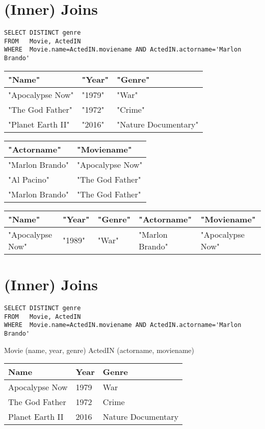 \documentclass{article}
\begin{document}
\section*{(Inner) Joins}
\begin{verbatim}
SELECT DISTINCT genre
FROM   Movie, ActedIN
WHERE  Movie.name=ActedIN.moviename AND ActedIN.actorname='Marlon Brando'
\end{verbatim}

\begin{tabular}{lll}
\hline
"Name" & "Year" & "Genre" \\
\hline
"Apocalypse Now" & "1979" & "War" \\
"The God Father" & "1972" & "Crime" \\
"Planet Earth II" & "2016" & "Nature Documentary" \\
\hline
\end{tabular}

\begin{tabular}{ll}
\hline
"Actorname" & "Moviename" \\
\hline
"Marlon Brando" & "Apocalypse Now" \\
"Al Pacino" & "The God Father" \\
"Marlon Brando" & "The God Father" \\
\hline
\end{tabular}

\begin{tabular}{lllll}
\hline
"Name" & "Year" & "Genre" & "Actorname" & "Moviename" \\
\hline
"Apocalypse Now" & "1989" & "War" & "Marlon Brando" & "Apocalypse Now" \\
\hline
\end{tabular}

\section*{(Inner) Joins}
\begin{verbatim}
SELECT DISTINCT genre
FROM   Movie, ActedIN
WHERE  Movie.name=ActedIN.moviename AND ActedIN.actorname='Marlon Brando'
\end{verbatim}
Movie (name, year, genre)
ActedIN (actorname, moviename)

\begin{tabular}{lll}
\hline
Name & Year & Genre \\
\hline
Apocalypse Now & 1979 & War \\
The God Father & 1972 & Crime \\
Planet Earth II & 2016 & Nature Documentary \\
\hline
\end{tabular}
\end{document}
